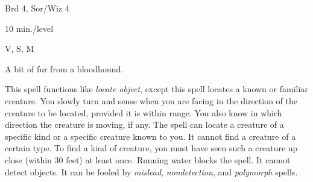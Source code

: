 
\begin{description*}
\item[Level:] Brd 4, Sor/Wiz 4
\item[Duration:] 10 min./level
\item[Components:] V, S, M
\item[Arcane Material Component:] A bit of fur from a bloodhound.
\end{description*}

This spell functions like \textit{locate object}, except this spell locates a known
or familiar creature.
You slowly turn and sense when you are facing in the direction of the creature
to be located, provided it is within range. You also know in which direction the
creature is moving, if any.
The spell can locate a creature of a specific kind or a specific creature known
to you. It cannot find a creature of a certain type. To find a kind of creature,
you must have seen such a creature up close (within 30 feet) at least once.
Running water blocks the spell. It cannot detect objects. It can be fooled by \textit{mislead},
\textit{nondetection}, and \textit{polymorph} spells.